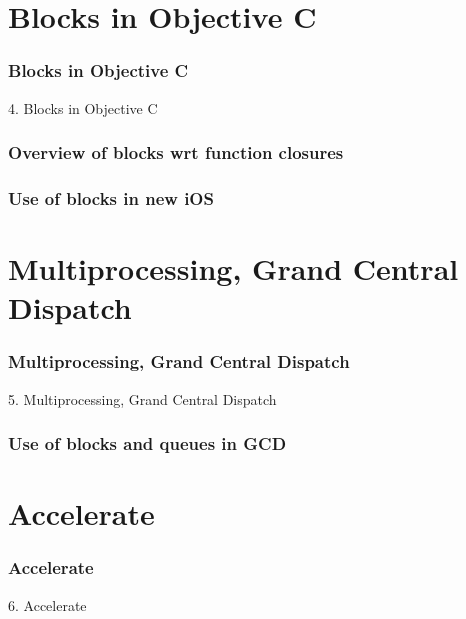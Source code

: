 \documentclass[10pt]{beamer}
\begin{document}
  

  
    
\section{Blocks in Objective C}
\begin{frame}[fragile]
  \frametitle{Blocks in Objective C}
  4. Blocks in Objective C
\end{frame}


    
\begin{frame}[fragile]
  \frametitle{Overview of blocks wrt function closures}
  
\end{frame}

    
\begin{frame}[fragile]
  \frametitle{Use of blocks in new iOS}
  
\end{frame}

    

   
  

  
    
\section{Multiprocessing, Grand Central Dispatch}
\begin{frame}[fragile]
  \frametitle{Multiprocessing, Grand Central Dispatch}
  5. Multiprocessing, Grand Central Dispatch
\end{frame}


    
\begin{frame}[fragile]
  \frametitle{Use of blocks and queues in GCD}
  
\end{frame}

    

   
  

  
    
\section{Accelerate}
\begin{frame}[fragile]
  \frametitle{Accelerate}
  6. Accelerate
\end{frame}
\end{document}
